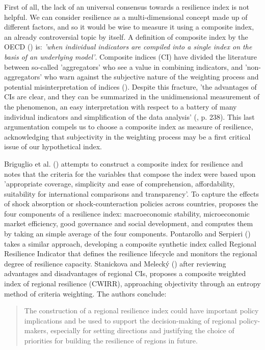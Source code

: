 \documentclass[12pt]{article}
\begin{document}
First of all, the lack of an universal consensus towards a resilience index is not helpful. We can consider resilience as a multi-dimensional concept made up of different factors, and so it would be wise to measure it using a composite index, an already controversial topic by itself. A definition of composite index by the OECD (\citeyear{oecd_handbook_2008}) is: \textit{'when individual indicators are compiled into a single index on the basis of an underlying model'}. Composite indices (CI) have divided the literature between so-called 'aggregators' who see a value in combining indicators, and 'non-aggregators' who warn against the subjective nature of the weighting process and potential misinterpretation of indices (\cite{sharpe_literature_2004}). Despite this fracture, 'the advantages of CIs are clear, and they can be summarized in the unidimensional measurement of the phenomenon, an easy interpretation with respect to a battery of many individual indicators and simplification of the data analysis' (\cite{stanickova_understanding_2018}, p. 238). This last argumentation compels us to choose a composite index as measure of resilience, acknowledging that subjectivity in the weighting process may be a first critical issue of our hypothetical index.

Briguglio et al. (\citeyear{briguglio_economic_2009}) attempts to construct a composite index for resilience and notes that the criteria for the variables that compose the index were based upon 'appropriate coverage, simplicity and ease of comprehension, affordability, suitability for international comparisons and transparency'. To capture the effects of shock absorption or shock-counteraction policies across countries, proposes the four components of a resilience index: macroeconomic stability, microeconomic market efficiency, good governance and social development, and computes them by taking an simple average of the four components.
Pontarollo and Serpieri (\citeyear{pontarollo_composite_2020}) takes a similar approach, developing a composite synthetic index called Regional Resilience Indicator that defines the resilience lifecycle and monitors the regional degree of resilience capacity.
Stanickova and Meleck{\'y} (\citeyear{stanickova_understanding_2018})  after reviewing advantages and disadvantages of regional CIs, proposes a composite weighted index of regional resilience (CWIRR), approaching objectivity through an entropy method of criteria weighting. The authors conclude:
\begin{quote}
    The construction of a regional resilience index could have important policy implications and be used to support the decision-making of regional policy-makers, especially for setting directions and justifying the choice of priorities for building the resilience of regions in future.
\end{quote}
\end{document}
